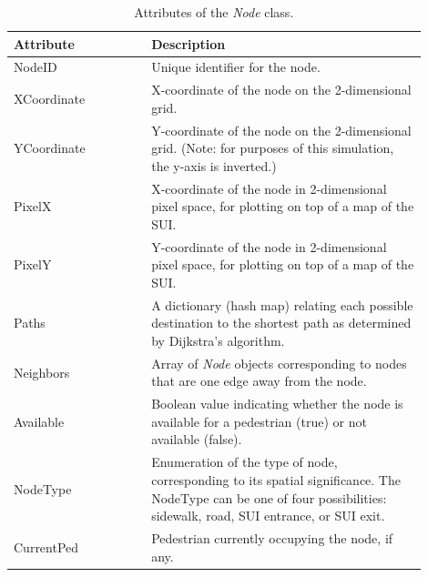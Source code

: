 \documentclass[12pt]{article}
\begin{document}
\def\arraystretch{1.5}
\begin{table}[hb!]
  \centering
    \begin{tabular}{p{0.3\linewidth}p{0.6\linewidth}}
     \hline
     Attribute & Description \\
     \hline
     NodeID      & Unique identifier for the node. \\
     XCoordinate & X-coordinate of the node on the 2-dimensional grid. \\
     YCoordinate & Y-coordinate of the node on the 2-dimensional grid.
                   (Note: for purposes of this simulation, the y-axis is
                    inverted.) \\
     PixelX      & X-coordinate of the node in 2-dimensional pixel space, for
                   plotting on top of a map of the SUI. \\
     PixelY      & Y-coordinate of the node in 2-dimensional pixel space, for
                   plotting on top of a map of the SUI. \\
     Paths       & A dictionary (hash map) relating each possible destination
                   to the shortest path as determined by Dijkstra's algorithm.\\
     Neighbors   & Array of \textit{Node} objects corresponding to nodes that are
                   one edge away from the node. \\
     Available	 & Boolean value indicating whether the node is available for a
                   pedestrian (true) or not available (false). \\
     NodeType    & Enumeration of the type of node, corresponding to its
                   spatial significance. The NodeType can be one of four
                   possibilities: sidewalk, road, SUI entrance, or SUI exit. \\
     CurrentPed & Pedestrian currently occupying the node, if any. \\
     \hline
    \end{tabular}
    \caption{Attributes of the \textit{Node} class.}
  \label{table:node}
\end{table}
\end{document}
